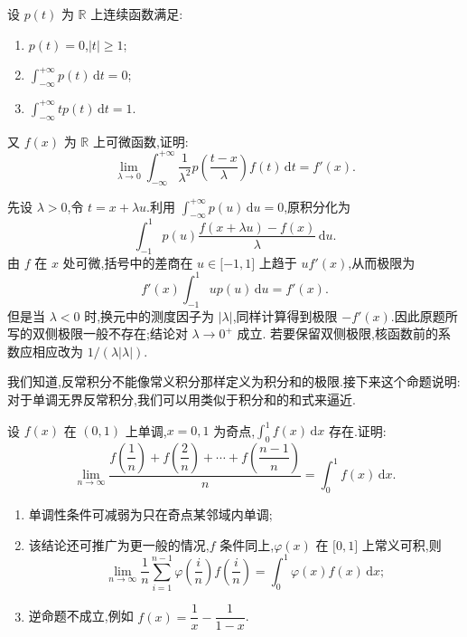 \begin{example}
  设 $p(t)$ 为 $\mathbb{R}$ 上连续函数满足:
  \begin{enumerate}
    \item $p(t)=0$,$|t|\geq1$;
    \item $\displaystyle\int_{-\infty}^{+\infty}p(t)\,\mathrm{d}t=0$;
    \item $\displaystyle\int_{-\infty}^{+\infty}tp(t)\,\mathrm{d}t=1$.
  \end{enumerate}
  又 $f(x)$ 为 $\mathbb{R}$ 上可微函数,证明:
  \[
    \displaystyle\lim\limits_{\lambda\to0}\int_{-\infty}^{+\infty}
    \dfrac{1}{\lambda^2}p\left(\dfrac{t-x}{\lambda}\right)f(t)\,\mathrm{d}t
    =f'(x).
  \]
\end{example}
\exampleblank

\begin{solution}
  先设 $\lambda>0$,令 $t=x+\lambda u$.利用
  $\displaystyle\int_{-\infty}^{+\infty}p(u)\,\mathrm{d}u=0$,原积分化为
  \[
    \displaystyle\int_{-1}^{1}p(u)\dfrac{f(x+\lambda u)-f(x)}{\lambda}\,\mathrm{d}u.
  \]
  由 $f$ 在 $x$ 处可微,括号中的差商在 $u\in\lbrack-1,1\rbrack$ 上趋于
  $u f'(x)$,从而极限为
  \[
    f'(x)\int_{-1}^{1}up(u)\,\mathrm{d}u=f'(x).
  \]
  但是当 $\lambda<0$ 时,换元中的测度因子为 $|\lambda|$,同样计算得到极限
  $-f'(x)$.因此原题所写的双侧极限一般不存在;结论对 $\lambda\to0^+$ 成立.
  若要保留双侧极限,核函数前的系数应相应改为 $1/(\lambda|\lambda|)$.
\end{solution}

我们知道,反常积分不能像常义积分那样定义为积分和的极限.接下来这个命题说明:对于单调无界反常积分,我们可以用类似于积分和的和式来逼近.

\begin{proposition}[\markstar]
  设 $f(x)$ 在 $(0,1)$ 上单调,$x=0,1$ 为奇点,$\displaystyle\int_0^1f(x)\,\mathrm{d}x$ 存在.证明:
  \[
    \displaystyle\lim\limits_{n\to\infty}
    \dfrac{f\left(\dfrac{1}{n}\right)+f\left(\dfrac{2}{n}\right)+\cdots+f\left(\dfrac{n-1}{n}\right)}{n}
    =\int_0^1f(x)\,\mathrm{d}x.
  \]
\end{proposition}

\begin{remark}
  \leavevmode
  \begin{enumerate}
    \item 单调性条件可减弱为只在奇点某邻域内单调;
    \item 该结论还可推广为更一般的情况,$f$ 条件同上,$\varphi(x)$ 在 $\lbrack 0,1\rbrack$ 上常义可积,则
          \[
            \displaystyle\lim\limits_{n\to\infty}\dfrac{1}{n}\sum\limits_{i=1}^{n-1}
            \varphi\left(\dfrac{i}{n}\right)f\left(\dfrac{i}{n}\right)
            =\int_0^1\varphi(x)f(x)\,\mathrm{d}x;
          \]
    \item 逆命题不成立,例如 $f(x)=\dfrac{1}{x}-\dfrac{1}{1-x}$.
  \end{enumerate}
\end{remark}

